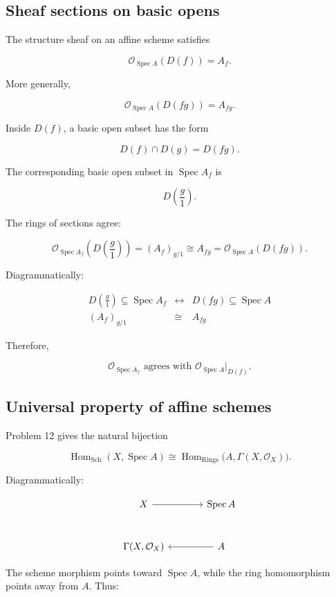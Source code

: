 \documentclass[12pt,a4paper]{article}
\DeclareMathOperator{\Hom}{Hom}
\newcommand{\OO}{\mathcal{O}}
\newcommand{\Spec}{\operatorname{Spec}}
\newcommand{\Sch}{\mathrm{Sch}}
\newcommand{\Rings}{\mathrm{Rings}}
\theoremstyle{notespace}
\begin{document}
\subsection{Sheaf sections on basic opens}

The structure sheaf on an affine scheme satisfies

\[
\OO_{\Spec A}(D(f))=A_f.
\]

More generally,

\[
\OO_{\Spec A}(D(fg))=A_{fg}.
\]

Inside \(D(f)\), a basic open subset has the form

\[
D(f)\cap D(g)=D(fg).
\]

The corresponding basic open subset in \(\Spec A_f\) is

\[
D\left(\frac g1\right).
\]

The rings of sections agree:

\[
\OO_{\Spec A_f}\left(D\left(\frac g1\right)\right)
=
(A_f)_{g/1}
\cong
A_{fg}
=
\OO_{\Spec A}(D(fg)).
\]

Diagrammatically:

\[
\begin{array}{ccc}
	D\left(\frac g1\right)\subseteq \Spec A_f
	&
	\longleftrightarrow
	&
	D(fg)\subseteq \Spec A
	\\[2mm]
	(A_f)_{g/1}
	&
	\cong
	&
	A_{fg}
\end{array}
\]

Therefore,

\[
\boxed{
	\OO_{\Spec A_f}
	\text{ agrees with }
	\OO_{\Spec A}|_{D(f)}.
}
\]

\subsection{Universal property of affine schemes}

Problem 12 gives the natural bijection

\[
\boxed{
	\Hom_{\Sch}(X,\Spec A)
	\cong
	\Hom_{\Rings}\bigl(A,\Gamma(X,\OO_X)\bigr).
}
\]

Diagrammatically:

\[
\begin{tikzcd}[column sep=large,row sep=large]
	X \arrow[r] & \Spec A \\
	\Gamma(X,\OO_X) & A \arrow[l]
\end{tikzcd}
\]

The scheme morphism points toward \(\Spec A\), while the ring homomorphism points away from \(A\). Thus:
\end{document}

